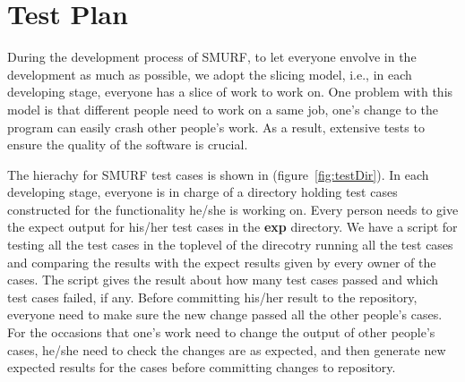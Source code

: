 \section{Test Plan}

During the development process of SMURF, to let everyone envolve in the development as much as possible, we adopt the slicing model, 
i.e., in each developing stage, everyone has a slice of work to work on.
One problem with this model is that different people need to work on a same job, 
one's change to the program can easily crash other people's work. 
As a result, extensive tests to ensure the quality of the software is crucial. 


The hierachy for SMURF test cases is shown in (figure~\ref{fig:testDir}). 
In each developing stage, everyone is in charge of a directory holding test cases constructed for the functionality he/she is working on. 
Every person needs to give the expect output for his/her test cases in the {\bf exp} directory.
We have a script for testing all the test cases in the toplevel of the direcotry running all the test cases and comparing the results with the expect results given by every owner of the cases. 
The script gives the result about how many test cases passed and which test cases failed, if any. 
Before committing his/her result to the repository, everyone need to make sure the new change passed all the other people's cases. 
For the occasions that one's work need to change the output of other people's cases, 
he/she need to check the changes are as expected, 
and then generate new expected results for the cases before committing changes to repository.


